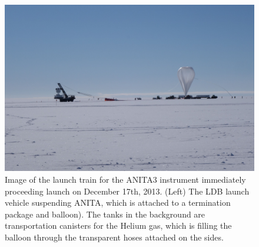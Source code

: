 \begin{figure}
\centering
	\includegraphics[width=\textwidth]{figures/Launch}
	\caption{Image of the launch train for the ANITA3 instrument immediately proceeding launch on December 17th, 2013.  (Left) The LDB launch vehicle suspending ANITA, which is attached to a termination package and balloon).  The tanks in the background are transportation canisters for the Helium gas, which is filling the balloon through the transparent hoses attached on the sides.}
	\label{fig:Launch}
\end{figure}
			

